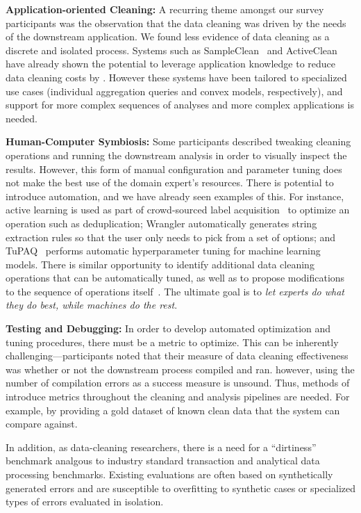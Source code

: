 \noindent\textbf{Application-oriented Cleaning:}  A recurring theme amongst our survey participants was the observation that the data cleaning was driven by the needs of the downstream application.  We found less evidence of data cleaning as a discrete and isolated process. Systems such as SampleClean~\cite{DBLP:journals/debu/KrishnanWFGKM015} and ActiveClean~\cite{activecleanarxiv} have already shown the potential to leverage application knowledge to reduce data cleaning costs by {\color{red}{an order of magnitude or more}}.  However these systems have been tailored to specialized use cases (individual aggregation queries and convex models, respectively), and support for more complex sequences of analyses and more complex applications is needed.

\noindent\textbf{Human-Computer Symbiosis:}   Some participants described tweaking cleaning operations and running the downstream analysis in order to visually inspect the results.  However, this form of manual configuration and parameter tuning does not make the best use of the domain expert's resources.   There is potential to introduce automation, and we have already seen examples of this.  For instance, active learning is used as part of crowd-sourced label acquisition~\cite{gokhale2014corleone,DBLP:journals/pvldb/HaasW0F15} to optimize an operation such as deduplication;  Wrangler automatically generates string extraction rules so that the user only needs to pick from a set of options; and TuPAQ~\cite{sparks2015automating} performs automatic hyperparameter tuning for machine learning models.   There is similar opportunity to identify additional data cleaning operations that can be automatically tuned, as well as to propose modifications to the sequence of operations itself~\cite{wisteria}.  The ultimate goal is to {\it let experts do what they do best, while machines do the rest}.


\noindent\textbf{Testing and Debugging:} In order to develop automated optimization and tuning procedures, there must be a metric to optimize.  This can be inherently challenging---participants noted that their measure of data cleaning effectiveness was whether or not the downstream process compiled and ran.  however, using the number of compilation errors as a success measure is unsound.  Thus, methods of introduce metrics throughout the cleaning and analysis pipelines are needed.  For example, by providing a gold dataset of known clean data that the system can compare against.  

In addition, as data-cleaning researchers, there is a need for a ``dirtiness'' benchmark analgous to industry standard transaction and analytical data processing benchmarks.  Existing evaluations are often based on synthetically generated errors and are susceptible to overfitting to synthetic cases or specialized types of errors evaluated in isolation.  

